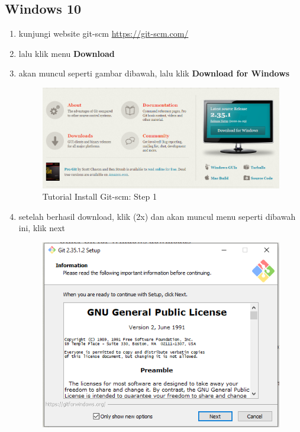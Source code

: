 \subsection{Windows 10}
\begin{enumerate}
\item kunjungi website git-scm \url{https://git-scm.com/}
\item lalu klik menu \textbf{Download}
\item akan muncul seperti gambar dibawah, lalu klik \textbf{Download for Windows}
\begin{figure}[H]
        \centerline{\includegraphics[scale=0.3]{figures/instalasi-git-scm-windows/step1}}
        \caption{Tutorial Install Git-scm: Step 1}
\end{figure}
\item setelah berhasil download, klik (2x) dan akan muncul menu seperti dibawah ini, klik next
\begin{figure}[H]
        \centerline{\includegraphics[scale=0.5]{figures/instalasi-git-scm-windows/step2}}

\end{figure}
\end{enumerate}
